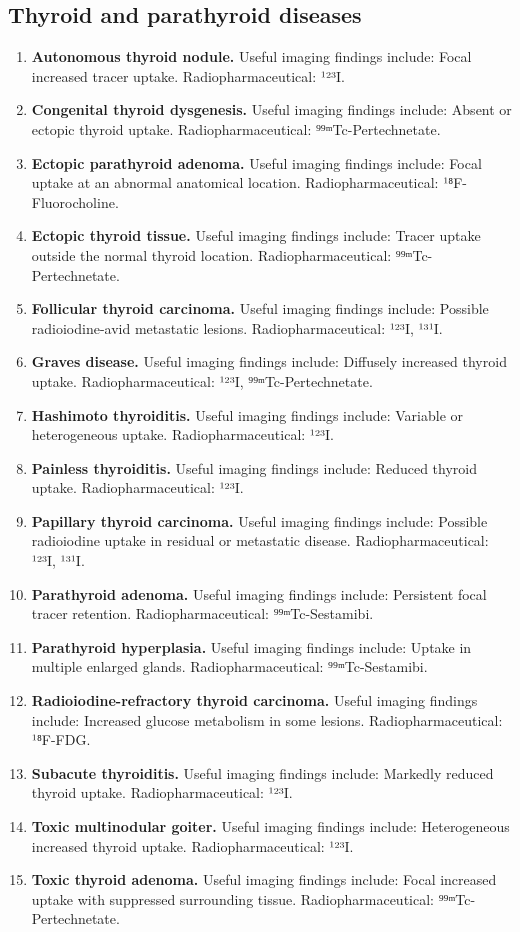 \subsection{Thyroid and parathyroid diseases}
\begin{enumerate}[leftmargin=*,itemsep=0.45em,topsep=0.4em]
\item \textbf{Autonomous thyroid nodule.} Useful imaging findings include: Focal increased tracer uptake. Radiopharmaceutical: ¹²³I.
\item \textbf{Congenital thyroid dysgenesis.} Useful imaging findings include: Absent or ectopic thyroid uptake. Radiopharmaceutical: ⁹⁹ᵐTc-Pertechnetate.
\item \textbf{Ectopic parathyroid adenoma.} Useful imaging findings include: Focal uptake at an abnormal anatomical location. Radiopharmaceutical: ¹⁸F-Fluorocholine.
\item \textbf{Ectopic thyroid tissue.} Useful imaging findings include: Tracer uptake outside the normal thyroid location. Radiopharmaceutical: ⁹⁹ᵐTc-Pertechnetate.
\item \textbf{Follicular thyroid carcinoma.} Useful imaging findings include: Possible radioiodine-avid metastatic lesions. Radiopharmaceutical: ¹²³I, ¹³¹I.
\item \textbf{Graves disease.} Useful imaging findings include: Diffusely increased thyroid uptake. Radiopharmaceutical: ¹²³I, ⁹⁹ᵐTc-Pertechnetate.
\item \textbf{Hashimoto thyroiditis.} Useful imaging findings include: Variable or heterogeneous uptake. Radiopharmaceutical: ¹²³I.
\item \textbf{Painless thyroiditis.} Useful imaging findings include: Reduced thyroid uptake. Radiopharmaceutical: ¹²³I.
\item \textbf{Papillary thyroid carcinoma.} Useful imaging findings include: Possible radioiodine uptake in residual or metastatic disease. Radiopharmaceutical: ¹²³I, ¹³¹I.
\item \textbf{Parathyroid adenoma.} Useful imaging findings include: Persistent focal tracer retention. Radiopharmaceutical: ⁹⁹ᵐTc-Sestamibi.
\item \textbf{Parathyroid hyperplasia.} Useful imaging findings include: Uptake in multiple enlarged glands. Radiopharmaceutical: ⁹⁹ᵐTc-Sestamibi.
\item \textbf{Radioiodine-refractory thyroid carcinoma.} Useful imaging findings include: Increased glucose metabolism in some lesions. Radiopharmaceutical: ¹⁸F-FDG.
\item \textbf{Subacute thyroiditis.} Useful imaging findings include: Markedly reduced thyroid uptake. Radiopharmaceutical: ¹²³I.
\item \textbf{Toxic multinodular goiter.} Useful imaging findings include: Heterogeneous increased thyroid uptake. Radiopharmaceutical: ¹²³I.
\item \textbf{Toxic thyroid adenoma.} Useful imaging findings include: Focal increased uptake with suppressed surrounding tissue. Radiopharmaceutical: ⁹⁹ᵐTc-Pertechnetate.
\end{enumerate}

